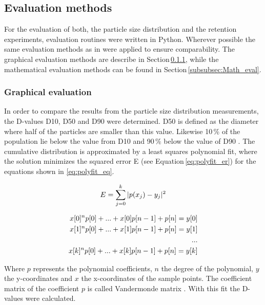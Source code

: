 \subsection{Evaluation methods}
\label{subsec:Eval}
For the evaluation of both, the particle size distribution and the retention experiments, evaluation routines were written in Python. Wherever possible the same evaluation methods as in \cite{AndreMaster} were applied to ensure comparability. The graphical evaluation methods are describe in Section\,\ref{subsubsec:Graph_eval}, while the mathematical evaluation methods can be found in Section\,\ref{subsubsec:Math_eval}.

\subsubsection{Graphical evaluation}
\label{subsubsec:Graph_eval}
In order to compare the results from the particle size distribution measurements, the D-values D10, D50 and D90 were determined. D50 is defined as the diameter where half of the particles are smaller than this value. Likewise 10\,\% of the population lie below the value from D10 and 90\,\% below the value of D90 \cite{merkus2009particle}. The cumulative distribution is  approximated by a least squares polynomial fit, where the solution minimizes the squared error E (see Equation\,\ref{eq:polyfit_er}) for the equations shown in \ref{eq:polyfit_eq}.  

\begin{equation}
\label{eq:polyfit_er}
\centering
E = \sum_{j=0}^{k}\vert p(x_{j})-y_{j}\vert^{2}
\end{equation}

\begin{equation}
\label{eq:polyfit_eq}
\centering
\begin{split}
x[0]^{n}p[0] + ... + x[0]p[n-1] + p[n] = y[0] \\
x[1]^{n}p[0] + ... + x[1]p[n-1] + p[n] = y[1]  \\
... \\ 
x[k]^{n}p[0] + ... + x[k]p[n-1] + p[n] = y[k]
\end{split}
\end{equation}

Where $p$ represents the polynomial coefficients, $n$ the degree of the polynomial, $y$ the y-coordinates and $x$ the x-coordinates of the sample points. The coefficient matrix of the coefficient $p$ is called Vandermonde matrix \cite{bjorck1970solution}. With this fit the D-values were calculated. 

